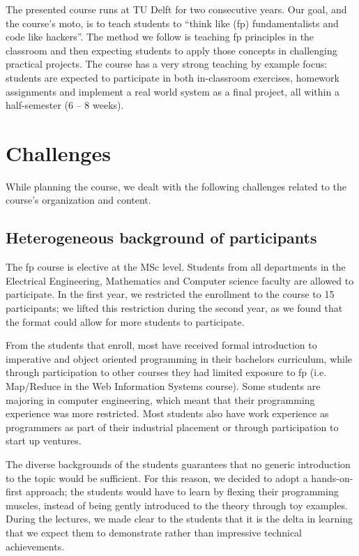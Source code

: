 \documentclass[conference]{sig-alternate}
\begin{document}
The presented course runs at TU Delft for two consecutive years. Our goal, and
the course's moto, is to teach students to  ``think like ({\sc fp})
fundamentalists and code like hackers''. The method we follow is teaching
{\sc fp} principles in the classroom and then expecting students
to apply those concepts in challenging practical projects. The course has a very
strong teaching by example focus: students are expected to participate in both
in-classroom exercises, homework assignments and implement a real world system
as a final project, all within a half-semester (6 -- 8 weeks). 


\section{Challenges}

While planning the course, we dealt with the following challenges related
to the course's organization and content.

\subsection{Heterogeneous background of participants}

The {\sc fp} course is elective at the MSc level. Students from
all departments in the Electrical Engineering, Mathematics and Computer science
faculty are allowed to participate. In the first year, we restricted the
enrollment to the course to 15 participants; we lifted this
restriction during the second year, as we found that the format could allow for
more students to participate.

From the students that enroll, most have received formal introduction to
imperative and object oriented programming in their bachelors curriculum, while
through participation to other courses they had limited exposure to {\sc fp}
(i.e. Map/Reduce in the Web Information Systems course). Some students are
majoring in computer engineering, which meant that their programming experience
was more restricted. Most students also have work experience as programmers as
part of their industrial placement or through participation to start up
ventures.

The diverse backgrounds of the students guarantees that no ge\-ne\-ric
introduction to the topic would be sufficient. For this reason, we decided
to adopt a hands-on-first approach; the students would have to learn by
flexing their programming muscles, instead of being gently introduced to 
the theory through toy examples. During the lectures, we made clear to the
students that it is the delta in learning that we expect them to
demonstrate rather than impressive technical achievements.
\end{document}
